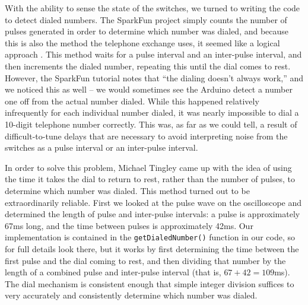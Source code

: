 \documentclass{es50report}
\begin{document}
    With the ability to sense the state of the switches, we turned to writing the code to detect dialed numbers. The SparkFun project simply counts the number of pulses generated in order to determine which number was dialed, and because this is also the method the telephone exchange uses, it seemed like a logical approach \cite{seidle05}. This method waits for a pulse interval and an inter-pulse interval, and then increments the dialed number, repeating this until the dial comes to rest. However, the SparkFun tutorial notes that ``the dialing doesn't always work,'' and we noticed this as well -- we would sometimes see the Arduino detect a number one off from the actual number dialed. While this happened relatively infrequently for each individual number dialed, it was nearly impossible to dial a 10-digit telephone number correctly. This was, as far as we could tell, a result of difficult-to-tune delays that are necessary to avoid interpreting noise from the switches as a pulse interval or an inter-pulse interval.

    In order to solve this problem, Michael Tingley came up with the idea of using the time it takes the dial to return to rest, rather than the number of pulses, to determine which number was dialed. This method turned out to be extraordinarily reliable. First we looked at the pulse wave on the oscilloscope and determined the length of pulse and inter-pulse intervals: a pulse is approximately 67ms long, and the time between pulses is approximately 42ms. Our implementation is contained in the \verb+getDialedNumber()+ function in our code, so for full details look there, but it works by first determining the time between the first pulse and the dial coming to rest, and then dividing that number by the length of a combined pulse and inter-pulse interval (that is, $67 + 42 = 109$ms). The dial mechanism is consistent enough that simple integer division suffices to very accurately and consistently determine which number was dialed.
\end{document}
